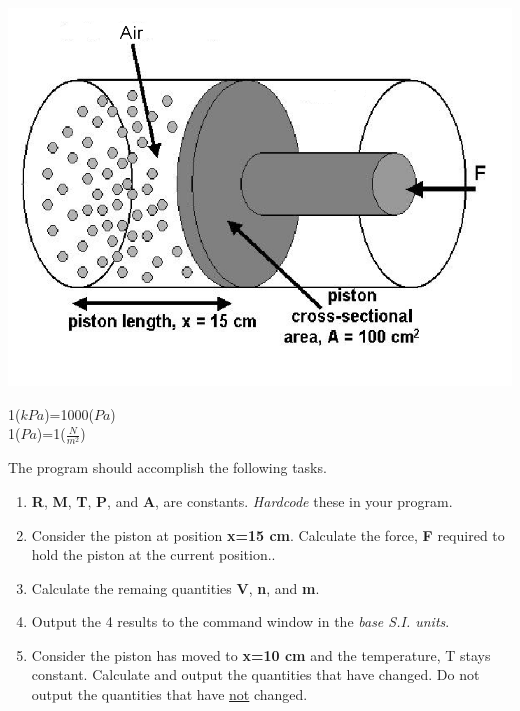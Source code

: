 \documentclass[12pt]{article}
\begin{document}
\begin{description}[labelindent=1cm]
\begin{description}
\begin{multicols}{2}
            \includegraphics[scale=.30]{ideal_gas_law_fig1.png} \\    
            \end{multicols}
               1($kPa$)=1000($Pa$)\\
               1($Pa$)=1($\frac{N}{m^2}$)

	\end{description}



\item[\textbf{\underline{Program Minimum Requirements:}}] \hfill \vspace{0mm}

The program should accomplish the following tasks. 


\begin{enumerate}
            \item
            {\bf R}, {\bf M}, {\bf T}, {\bf P}, and {\bf A}, are constants. {\it Hardcode} these in your program. \\
            \item
            Consider the piston at position  {\bf x=15 cm}. Calculate the force, {\bf F} required to hold the piston at the current position..\\	
            \item
            Calculate the remaing quantities {\bf V}, {\bf n}, and {\bf m}.\\ 
            \item
            Output the 4 results to the command window in the {\it base S.I. units}. \\
            \item
            Consider the piston has moved to {\bf x=10 cm} and the temperature, T stays constant. Calculate and output the quantities that have changed. Do not output the quantities that have \underline{not} changed.\\\\  
\end{enumerate}	 


\end{description}
\end{document}
